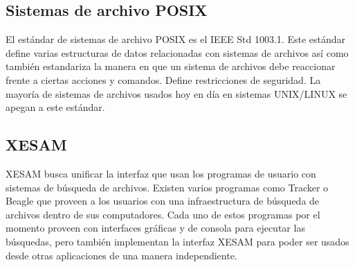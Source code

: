 \subsection{Sistemas de archivo POSIX}

El estándar de sistemas de archivo POSIX es el IEEE Std 1003.1. Este estándar define varias estructuras de datos relacionadas con sistemas de archivos así como también estandariza la manera en que un sistema de archivos debe reaccionar frente a ciertas acciones y comandos. Define restricciones de seguridad. La mayoría de sistemas de archivos usados hoy en día en sistemas UNIX/LINUX se apegan a este estándar.

\subsection{XESAM}

XESAM busca unificar la interfaz que usan los programas de usuario con sistemas de búsqueda de archivos. Existen varios programas como Tracker o Beagle que proveen a los usuarios con una infraestructura de búsqueda de archivos dentro de sus computadores. Cada uno de estos programas por el momento proveen con interfaces gráficas y de consola para ejecutar las búsquedas, pero también implementan la interfaz XESAM para poder ser usados desde otras aplicaciones de una manera independiente.




